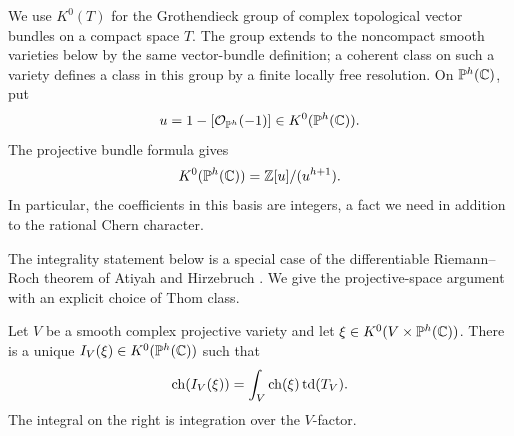 We use \(K^0(T)\) for the Grothendieck group of complex topological
vector bundles on a compact space \(T\).  The group extends to the
noncompact smooth varieties below by the same vector-bundle
definition; a coherent class on such a variety defines a class in
this group by a finite locally free resolution.
On \(\mathbb P^h(\mathbb C)\), put
\[
 u=1-[\mathcal O_{\mathbb P^h}(-1)]\in K^0(\mathbb P^h(\mathbb C)).
\]
The projective bundle formula gives
\begin{equation}\label{eq:index-projective-k}
 K^0(\mathbb P^h(\mathbb C))=\mathbb Z[u]/(u^{h+1}).
\end{equation}
In particular, the coefficients in this basis are integers, a fact
we need in addition to the rational Chern character.

The integrality statement below is a special case of the differentiable
Riemann--Roch theorem of Atiyah and Hirzebruch
\cite[Theorem~1 and Remark~(2)]{AtiyahHirzebruch59}.
We give the projective-space argument with an explicit choice of Thom
class.

\begin{lemma}\label{lem:index-integral-pushforward}
Let \(V\) be a smooth complex projective variety and let
\(\xi\in K^0(V\times\mathbb P^h(\mathbb C))\).  There is a unique
\(I_V(\xi)\in K^0(\mathbb P^h(\mathbb C))\) such that
\begin{equation}\label{eq:index-integral-pushforward}
 \operatorname{ch}(I_V(\xi))
   =\int_V\operatorname{ch}(\xi)\operatorname{td}(T_V).
\end{equation}
The integral on the right is integration over the \(V\)-factor.
\end{lemma}

